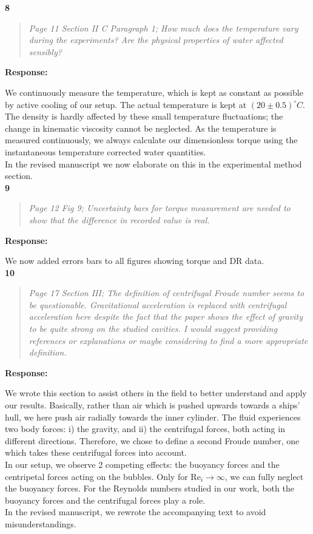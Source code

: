 \documentclass[10pt]{article}
\renewcommand{\Re}{\mathrm{Re}}
\newcommand{\strong}[1]{\textbf{#1}}
\newcommand{\question}[1]{\begin{quote} \emph{#1}  \end{quote} }
\begin{document}
\noindent \strong{8}

\question{Page 11 Section II C Paragraph 1; How much does the temperature vary during the experiments? Are the physical properties of water affected sensibly? }

\noindent \strong{Response:} 

\noindent We continuously measure the temperature, which is kept as constant as possible by active cooling of our setup. The actual temperature is kept at $(20\pm0.5) ^{\circ}C$. The density is hardly affected by these small temperature fluctuations; the change in kinematic viscosity cannot be neglected. As the temperature is measured continuously, we always calculate our dimensionless torque using the instantaneous temperature corrected water quantities. \\ In the revised manuscript we now elaborate on this in the experimental method section.  \\

\noindent \strong{9}

\question{Page 12 Fig 9; Uncertainty bars for torque measurement are needed to show that the difference in recorded value is real. }

\noindent \strong{Response:} 

\noindent We now added errors bars to all figures showing torque and DR data. \\

\noindent \strong{10}

\question{Page 17 Section III; The definition of centrifugal Froude number seems to be questionable. Gravitational acceleration is replaced with centrifugal acceleration here despite the fact that the paper shows the effect of gravity to be quite strong on the studied cavities. I would suggest providing references or explanations or maybe considering to find a more appropriate definition. }

\noindent \strong{Response:} 

\noindent We wrote this section to assist others in the field to better understand and apply our results. Basically, rather than air which is pushed upwards towards a ships' hull, we here push air radially towards the inner cylinder. The fluid experiences two body forces: i) the gravity, and ii) the centrifugal forces, both acting in different directions. Therefore, we chose to define a second Froude number, one which takes these centrifugal forces into account. \\
In our setup, we observe 2 competing effects: the buoyancy forces and the centripetal forces acting on the bubbles. Only for $\Re_i \to \infty$, we can fully neglect the buoyancy forces. For the Reynolds numbers studied in our work, both the buoyancy forces and the centrifugal forces play a role. \\
In the revised manuscript, we rewrote the accompanying text to avoid misunderstandings.\\
\end{document}
